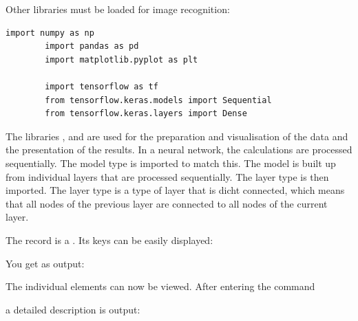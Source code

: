 Other libraries must be loaded for image recognition:

\begin{code}
    \begin{lstlisting}[numbers=none]
        import numpy as np
        import pandas as pd
        import matplotlib.pyplot as plt
        
        import tensorflow as tf
        from tensorflow.keras.models import Sequential
        from tensorflow.keras.layers import Dense
    \end{lstlisting}
    \caption{Libraries for Hello World 2 - Iris}
\end{code}


The libraries ,  and  are used for the preparation and visualisation of the data and the presentation of the results. In a neural network, the calculations are processed sequentially. The model type  is imported to match this. The model is built up from individual layers that are processed sequentially. The layer type  is then imported. The layer type is a type of layer that is \glqq dicht\grqq{} connected, which means that all nodes of the previous layer are connected to all nodes of the current layer.


The record is a . Its keys can be easily displayed:

\medskip


\medskip

You get as output:

\medskip


\medskip

The individual elements can now be viewed. After entering the command 

\medskip


\medskip

a detailed description is output:

